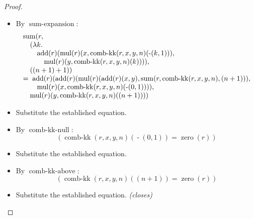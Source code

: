 \documentclass[11pt]{article}
\theoremstyle{plain}
\begin{document}
\begin{proof}
\begin{itemize}[leftmargin=2.8em, itemsep=4pt, parsep=1pt]
  \item[\textbf{36}] By $\operatorname{sum\text{-}expansion}$:
\begin{equation*}
\begin{array}{@{}l@{}} \operatorname{sum}(r, \\ \quad (\lambda k.\; \\ \quad \quad \operatorname{add}(r)(\operatorname{mul}(r)(x, \operatorname{comb\text{-}kk}(r, x, y, n)(\operatorname{\text{-}}(k, 1))), \\ \quad \quad \quad \operatorname{mul}(r)(y, \operatorname{comb\text{-}kk}(r, x, y, n)(k)))), \\ \quad ((n + 1) + 1)) \\ =\; \operatorname{add}(r)(\operatorname{add}(r)(\operatorname{mul}(r)(\operatorname{add}(r)(x, y), \operatorname{sum}(r, \operatorname{comb\text{-}kk}(r, x, y, n), (n + 1))), \\ \quad \quad \operatorname{mul}(r)(x, \operatorname{comb\text{-}kk}(r, x, y, n)(\operatorname{\text{-}}(0, 1)))), \\ \quad \operatorname{mul}(r)(y, \operatorname{comb\text{-}kk}(r, x, y, n)((n + 1)))) \end{array}
\end{equation*}

  \item[\textbf{37}] Substitute the established equation.
  \item[\textbf{38}] By $\operatorname{comb\text{-}kk\text{-}null}$:
\begin{equation*}
(\operatorname{comb\text{-}kk}(r, x, y, n)(\operatorname{\text{-}}(0, 1)) = \operatorname{zero}(r))
\end{equation*}

  \item[\textbf{39}] Substitute the established equation.
  \item[\textbf{40}] By $\operatorname{comb\text{-}kk\text{-}above}$:
\begin{equation*}
(\operatorname{comb\text{-}kk}(r, x, y, n)((n + 1)) = \operatorname{zero}(r))
\end{equation*}

  \item[\textbf{41--42}] Substitute the established equation.  \emph{(closes)}
\end{itemize}
\end{proof}
\end{document}
